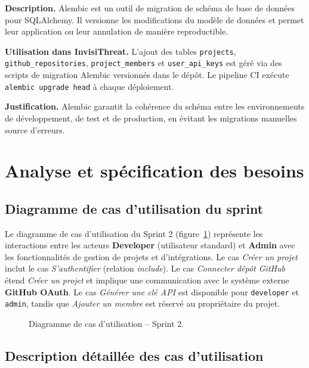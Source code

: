 \textbf{Description.} Alembic est un outil de migration de schéma de base de données pour SQLAlchemy. Il versionne les modifications du modèle de données et permet leur application ou leur annulation de manière reproductible.

\textbf{Utilisation dans InvisiThreat.} L'ajout des tables \texttt{projects}, \texttt{github\_repositories}, \texttt{project\_members} et \texttt{user\_api\_keys} est géré via des scripts de migration Alembic versionnés dans le dépôt. Le pipeline CI exécute \texttt{alembic upgrade head} à chaque déploiement.

\textbf{Justification.} Alembic garantit la cohérence du schéma entre les environnements de développement, de test et de production, en évitant les migrations manuelles source d'erreurs.

\section{Analyse et spécification des besoins}

\subsection{Diagramme de cas d'utilisation du sprint}

Le diagramme de cas d'utilisation du Sprint 2 (figure~\ref{fig:sprint2-use-case}) représente les interactions entre les acteurs \textbf{Developer} (utilisateur standard) et \textbf{Admin} avec les fonctionnalités de gestion de projets et d'intégrations. Le cas \textit{Créer un projet} inclut le cas \textit{S'authentifier} (relation \textit{include}). Le cas \textit{Connecter dépôt GitHub} étend \textit{Créer un projet} et implique une communication avec le système externe \textbf{GitHub OAuth}. Le cas \textit{Générer une clé API} est disponible pour \texttt{developer} et \texttt{admin}, tandis que \textit{Ajouter un membre} est réservé au propriétaire du projet.

\begin{figure}[H]
\centering
\fbox{\rule{0pt}{2in}\rule{0.9\linewidth}{0pt}}
\caption{Diagramme de cas d'utilisation -- Sprint 2.}
\label{fig:sprint2-use-case}
\end{figure}

\subsection{Description détaillée des cas d'utilisation}

